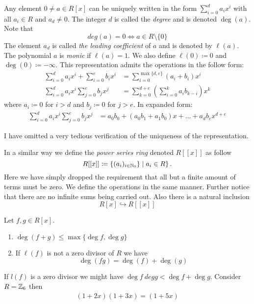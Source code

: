 \documentclass[master.tex]{subfiles}
\newcommand{\poly}[3]{\sum_{#1=0}^#3 {#2}_{#1}x^{#1}}
\begin{document}
\begin{defn}
  Any element \(0 \neq a \in R[x]\) can be uniquely written in the form \(\poly{i}{a}{d}\) with all \(a_i \in R\) and
  \(a_d \neq 0\). The integer \(d\) is called the \emph{degree} and is denoted \(\deg(a)\). Note that
  \[deg(a) = 0 \iff a \in R \setminus \{0\}\]
  The element \(a_d\) is called \emph{the leading coefficient} of \(a\) and is denoted by \(\ell(a)\). The polynomial
  \(a\) is \emph{monic} if \(\ell(a)=1\). We also define \(\ell(0) \coloneqq 0\) and \(\deg(0) \coloneqq -
  \infty\). This representation admits the operations in the follow form:
  \begin{align*}
    \poly{i}{a}{d}+\poly{i}{b}{e} &= \sum_{i=0}^{\max\{d,e\}}(a_i+b_i)x^i\\
    \poly{i}{a}{d}\poly{j}{b}{e}  &= \sum_{k=0}^{d+e}\left(\sum_{i=0}^k a_i b_{k-i}\right)x^k                              
  \end{align*}
  where \(a_i \coloneqq 0\) for \(i > d\) and \(b_j \coloneqq 0\) for \(j > e\). In expanded form:
  \begin{align*}
    \poly{i}{a}{d}\poly{j}{b}{e} &= a_0 b_0 + (a_0 b_1 + a_1 b_0)x + \ldots + a_db_e x^{d+e}
  \end{align*}
\end{defn}
I have omitted a very tedious verification of the uniqueness of the representation.
\begin{rmk}
  In a similar way we define the \emph{power series ring} denoted \(R[[x]]\) as follow
  \[R[[x]] \coloneqq \left\{(a_i)_{i \in {\mathbb N}_0}\} \mid a_i \in R\right\}.\]
  Here we have simply dropped the requirement that all but a finite amount of terms must be zero. We define the
  operations in the same manner. Further notice that there are no infinite sums being carried out. Also there is a
  natural inclusion
  \[R[x] \hookrightarrow R[[x]]\]
\end{rmk}

\begin{lem}
  Let \(f,g \in R[x]\). 
  \begin{enumerate}[label=(\alph*)]
  \item \(\deg(f+g) \le \max \{\deg f, \deg g\}\)
  \item If \(\ell(f)\) is not a zero divisor of \(R\) we have
    \[\deg(fg) = \deg(f)+\deg(g)\]
  \end{enumerate}
\end{lem}


\begin{example*}
  If \(l(f)\) is a zero divisor we might have \(\deg f \ deg g < \deg f + \deg g\). Consider \(R = {\mathbb Z}_6\) then
  \begin{align*}
    (1+2x)(1+3x) = (1+5x)
  \end{align*}
\end{example*}
\end{document}
